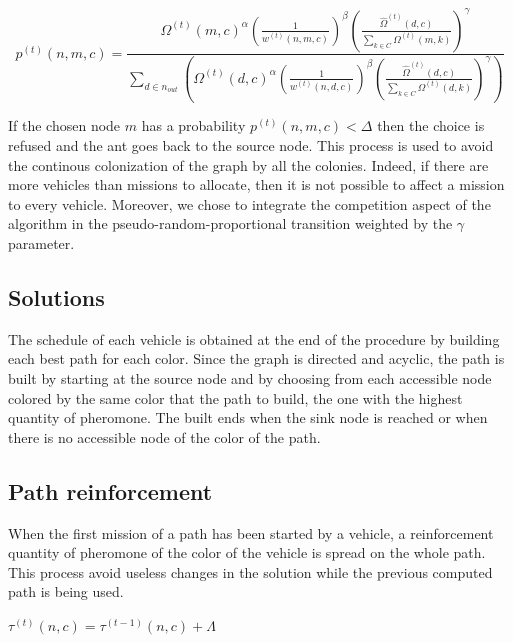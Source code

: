 \documentclass[a4paper,10pt]{article}
\begin{document}
\begin{equation*}
  p^{(t)}(n,m,c) = \frac
    {
      \Omega^{(t)}(m,c)^{\alpha}
      \left( \frac{1}{w^{(t)}(n,m,c)} \right) ^{\beta}
      \left( \frac{\hat \Omega^{(t)}(d,c)}{\sum_{k \in C} \Omega^{(t)}(m,k)} \right)^{\gamma}
    }
    {
      \sum_{d \in n_{out}} \left(
	\Omega^{(t)}(d,c)^{\alpha}
	\left( \frac{1}{w^{(t)}(n,d,c)} \right)^{\beta}
	\left( \frac{\hat \Omega^{(t)}(d,c)}{\sum_{k \in C} \Omega^{(t)}(d,k)} \right)^{\gamma}
      \right)
    }
\end{equation*}

If the chosen node $m$ has a probability $p^{(t)}(n,m,c) < \Delta$ then the choice is refused and the ant goes back to the source node. This process is used to avoid the continous colonization of the graph by all the colonies. Indeed, if there are more vehicles than missions to allocate, then it is not possible to affect a mission to every vehicle. Moreover, we chose to integrate the competition aspect of the algorithm in the pseudo-random-proportional transition weighted by the $\gamma$ parameter.

\subsection{Solutions}
The schedule of each vehicle is obtained at the end of the procedure by building each best path for each color. Since the graph is directed and acyclic, the path is built by starting at the source node and by choosing from each accessible node colored by the same color that the path to build, the one with the highest quantity of pheromone. The built ends when the sink node is reached or when there is no accessible node of the color of the path.

\subsection{Path reinforcement}
When the first mission of a path has been started by a vehicle, a reinforcement quantity of pheromone of the color of the vehicle is spread on the whole path. This process avoid useless changes in the solution while the previous computed path is being used.


\begin{algorithm}
\label{algoReinforcement}
\begin{algorithmic} 
\STATE $\tau^{(t)}(n,c) =  \tau^{(t-1)}(n,c) + \Lambda$
\ENDFOR
\end{algorithmic}
\end{algorithm}
\end{document}
